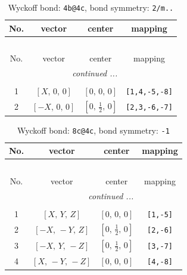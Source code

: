 \documentclass[fleqn,8pt]{jsarticle}
\begin{document}
\renewcommand{\arraystretch}{1.2}
\begin{longtable}{cccc}
\caption{Wyckoff bond: {\tt 4b@4c}, bond symmetry: {\tt 2/m..}}
 \\
 \hline \hline
No. & vector & center & mapping \\ \hline \endfirsthead

\multicolumn{3}{l}{\tablename\ \thetable{}} \\
 \hline \hline
No. & vector & center & mapping \\ \hline \endhead

 \hline \hline
\multicolumn{3}{r}{\footnotesize\it continued ...} \\ \endfoot

 \hline \hline
\multicolumn{3}{r}{} \\ \endlastfoot

1 & $\left[ X,\, 0,\, 0 \right]$ & $\left[ 0,\, 0,\, 0 \right]$ & {\tt [1,4,-5,-8]} \\ \hline
2 & $\left[ - X,\, 0,\, 0 \right]$ & $\left[ 0,\, \frac{1}{2},\, 0 \right]$ & {\tt [2,3,-6,-7]} \\
\end{longtable}
\renewcommand{\arraystretch}{1.2}
\begin{longtable}{cccc}
\caption{Wyckoff bond: {\tt 8c@4c}, bond symmetry: {\tt -1}}
 \\
 \hline \hline
No. & vector & center & mapping \\ \hline \endfirsthead

\multicolumn{3}{l}{\tablename\ \thetable{}} \\
 \hline \hline
No. & vector & center & mapping \\ \hline \endhead

 \hline \hline
\multicolumn{3}{r}{\footnotesize\it continued ...} \\ \endfoot

 \hline \hline
\multicolumn{3}{r}{} \\ \endlastfoot

1 & $\left[ X,\, Y,\, Z \right]$ & $\left[ 0,\, 0,\, 0 \right]$ & {\tt [1,-5]} \\ \hline
2 & $\left[ - X,\, - Y,\, Z \right]$ & $\left[ 0,\, \frac{1}{2},\, 0 \right]$ & {\tt [2,-6]} \\ \hline
3 & $\left[ - X,\, Y,\, - Z \right]$ & $\left[ 0,\, \frac{1}{2},\, 0 \right]$ & {\tt [3,-7]} \\ \hline
4 & $\left[ X,\, - Y,\, - Z \right]$ & $\left[ 0,\, 0,\, 0 \right]$ & {\tt [4,-8]} \\
\end{longtable}
\end{document}
